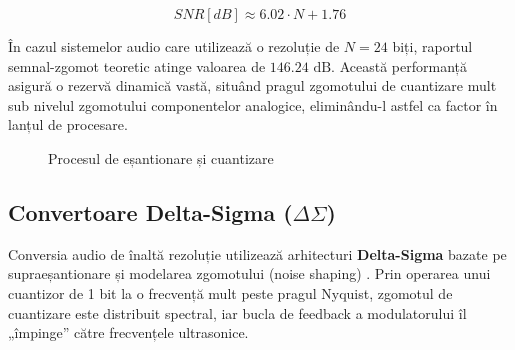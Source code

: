\begin{equation}
    SNR [dB] \approx 6.02 \cdot N + 1.76
    \label{eq:snr_quantization}
\end{equation}

În cazul sistemelor audio care utilizează o rezoluție de $N=24$ biți, raportul semnal-zgomot teoretic atinge valoarea de $146.24\text{ dB}$. Această performanță asigură o rezervă dinamică vastă, situând pragul zgomotului de cuantizare mult sub nivelul zgomotului componentelor analogice, eliminându-l astfel ca factor în lanțul de procesare.

\begin{figure}[H]
    \centering
    \caption{Procesul de eșantionare și cuantizare}
    \label{fig:sampling}
\end{figure}

\subsection{Convertoare Delta-Sigma ($\Delta\Sigma$)}
Conversia audio de înaltă rezoluție utilizează arhitecturi \textbf{Delta-Sigma} bazate pe supraeșantionare și modelarea zgomotului (noise shaping) \cite{zolzer2011dafx}. Prin operarea unui cuantizor de 1 bit la o frecvență mult peste pragul Nyquist, zgomotul de cuantizare este distribuit spectral, iar bucla de feedback a modulatorului îl „împinge” către frecvențele ultrasonice.

